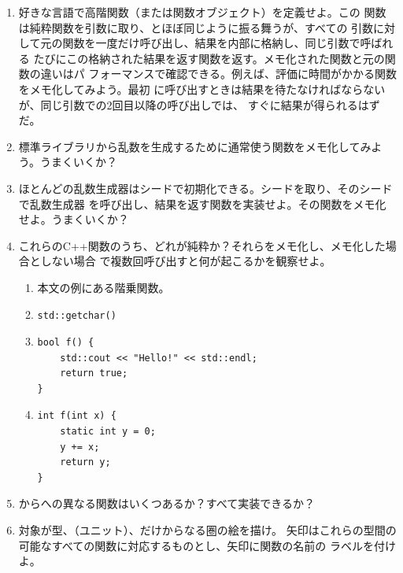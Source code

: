 \begin{enumerate}
  \tightlist
  \item
        好きな言語で高階関数（または関数オブジェクト）を定義せよ。この
        関数は純粋関数を引数に取り、とほぼ同じように振る舞うが、すべての
        引数に対して元の関数を一度だけ呼び出し、結果を内部に格納し、同じ引数で呼ばれる
        たびにこの格納された結果を返す関数を返す。メモ化された関数と元の関数の違いはパ
        フォーマンスで確認できる。例えば、評価に時間がかかる関数をメモ化してみよう。最初
        に呼び出すときは結果を待たなければならないが、同じ引数での2回目以降の呼び出しでは、
        すぐに結果が得られるはずだ。
  \item
        標準ライブラリから乱数を生成するために通常使う関数をメモ化してみよう。うまくいくか？
  \item
        ほとんどの乱数生成器はシードで初期化できる。シードを取り、そのシードで乱数生成器
        を呼び出し、結果を返す関数を実装せよ。その関数をメモ化せよ。うまくいくか？
  \item
        これらのC++関数のうち、どれが純粋か？それらをメモ化し、メモ化した場合としない場合
        で複数回呼び出すと何が起こるかを観察せよ。

        \begin{enumerate}
          \tightlist
          \item
                本文の例にある階乗関数。
          \item
                \begin{verbatim}
std::getchar()
\end{verbatim}
          \item
                \begin{verbatim}
bool f() {
    std::cout << "Hello!" << std::endl;
    return true;
}
\end{verbatim}
          \item
                \begin{verbatim}
int f(int x) {
    static int y = 0;
    y += x;
    return y;
}
\end{verbatim}
        \end{enumerate}
  \item
        からへの異なる関数はいくつあるか？すべて実装できるか？
  \item
        対象が型、\code{()}（ユニット）、だけからなる圏の絵を描け。
        矢印はこれらの型間の可能なすべての関数に対応するものとし、矢印に関数の名前の
        ラベルを付けよ。
\end{enumerate}
